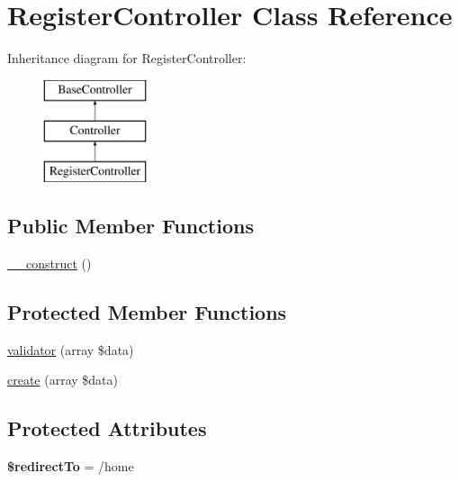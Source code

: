 \hypertarget{class_app_1_1_http_1_1_controllers_1_1_auth_1_1_register_controller}{}\section{Register\+Controller Class Reference}
\label{class_app_1_1_http_1_1_controllers_1_1_auth_1_1_register_controller}
Inheritance diagram for Register\+Controller\+:\begin{figure}[H]
\begin{center}
\leavevmode
\includegraphics[height=3.000000cm]{class_app_1_1_http_1_1_controllers_1_1_auth_1_1_register_controller}
\end{center}
\end{figure}
\subsection*{Public Member Functions}
\begin{DoxyCompactItemize}
\item 
\mbox{\hyperlink{class_app_1_1_http_1_1_controllers_1_1_auth_1_1_register_controller_a095c5d389db211932136b53f25f39685}{\+\_\+\+\_\+construct}} ()
\end{DoxyCompactItemize}
\subsection*{Protected Member Functions}
\begin{DoxyCompactItemize}
\item 
\mbox{\hyperlink{class_app_1_1_http_1_1_controllers_1_1_auth_1_1_register_controller_aa47350de63ea5295d9c9718e3d09135c}{validator}} (array \$data)
\item 
\mbox{\hyperlink{class_app_1_1_http_1_1_controllers_1_1_auth_1_1_register_controller_a791ba6c150a0a3047c7d8735e62cad02}{create}} (array \$data)
\end{DoxyCompactItemize}
\subsection*{Protected Attributes}
\begin{DoxyCompactItemize}
\item 
\mbox{\label{class_app_1_1_http_1_1_controllers_1_1_auth_1_1_register_controller_a1d19101ee5de7186666ce86a530cd501}} 
{\bfseries \$redirect\+To} = \textquotesingle{}/home\textquotesingle{}
\end{DoxyCompactItemize}



